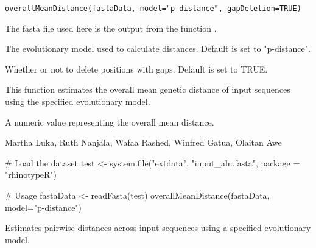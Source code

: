 \documentclass[a4paper]{book}
\begin{document}
%
\begin{Usage}
\begin{verbatim}
overallMeanDistance(fastaData, model="p-distance", gapDeletion=TRUE)
\end{verbatim}
\end{Usage}
%
\begin{Arguments}
\begin{ldescription}
\item[\code{fastaData}] 
The fasta file used here is the output from the function .

\item[\code{model}] 
The evolutionary model used to calculate distances. Default is set to "p-distance".

\item[\code{gapDeletion}] 
Whether or not to delete positions with gaps. Default is set to TRUE.

\end{ldescription}
\end{Arguments}
%
\begin{Details}
This function estimates the overall mean genetic distance of 
input sequences using the specified evolutionary model.
\end{Details}
%
\begin{Value}
A numeric value representing the overall mean distance.
\end{Value}
%
\begin{Author}
Martha Luka, Ruth Nanjala, Wafaa Rashed, Winfred Gatua, Olaitan Awe 
\end{Author}
%
\begin{SeeAlso}
\end{SeeAlso}
%
\begin{Examples}
\begin{ExampleCode}
# Load the dataset
test <- system.file("extdata", "input_aln.fasta", package = "rhinotypeR")

# Usage
fastaData <- readFasta(test)
overallMeanDistance(fastaData, model="p-distance")
\end{ExampleCode}
\end{Examples}
%
\begin{Description}
Estimates pairwise distances across input sequences using a specified evolutionary model.
\end{Description}
\end{document}
